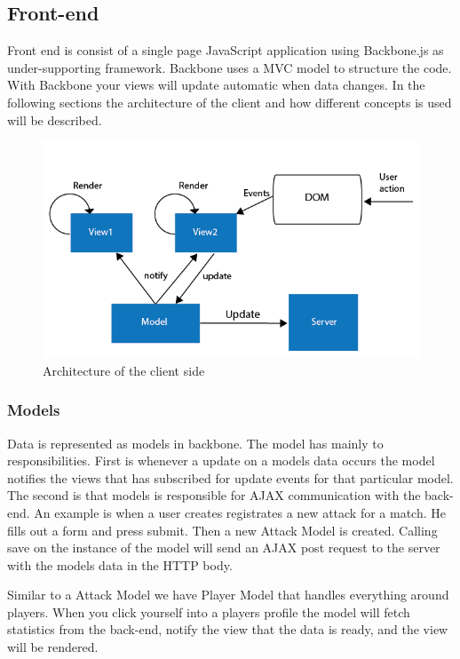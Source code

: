 \subsection{Front-end}

Front end is consist of a single page JavaScript application using Backbone.js as under-supporting framework. Backbone uses a MVC model to structure the code. With Backbone your views will update automatic when data changes. In the following sections the architecture of the client and how different concepts is used will be described. 

\begin{figure}[ht!]
\centering
\includegraphics[width=150mm]{images/architecture/backbone_architecture.png}
\caption{Architecture of the client side}
\label{overflow}
\end{figure}

\subsubsection{Models}

Data is represented as models in backbone. The model has mainly to responsibilities. First is whenever a update on a models data occurs the model notifies the views that has subscribed for update events for that particular model. The second is that models is responsible for AJAX communication  with the back-end. An example is when a user creates registrates a new attack for a match. He fills out a form and press submit. Then a new Attack Model is created. Calling save on the instance of the model will send an AJAX post request to the server with the models data in the HTTP body.

Similar to a Attack Model we have Player Model that handles everything around players. When you click yourself into a players profile the model will fetch statistics from the back-end, notify the view that the data is ready, and the view will be rendered.

